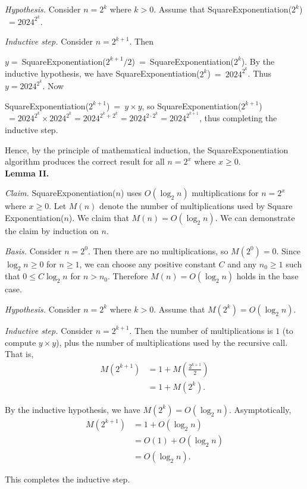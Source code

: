 \begin{enumerate}
\begin{solution}
\textit{Hypothesis. }Consider $n=2^k$ where $k>0$. Assume that {\sc SquareExponentiation}($2^k$)$~=2024^{2^k}$.

\textit{Inductive step. }Consider $n=2^{k+1}$. Then

$y=~${\sc SquareExponentiation}($2^{k+1}/2$)$~=~${\sc SquareExponentiation}($2^k$). By the inductive hypothesis, we have
{\sc SquareExponentiation}($2^k$)$~=~2024^{2^k}$. Thus $y=2024^{2^k}$. Now

{\sc SquareExponentiation}($2^{k+1}$)$~=~y\times y$, so {\sc SquareExponentiation}($2^{k+1}$)$~=2024^{2^k}\times 2024^{2^k}=2024^{2^k+2^k}=2024^{2\cdot 2^k}=2024^{2^{k+1}}$, thus completing the inductive step.

Hence, by the principle of mathematical induction, the {\sc SquareExponentiation} algorithm produces the correct result for all $n=2^x$ where $x\geq 0$.\\

\textbf{Lemma II. }

\textit{Claim. }{\sc SquareExponentiation}($n$) uses $O(\log_2n)$ multiplications for $n=2^x$ where $x\geq 0$. Let $M(n)$ denote the number of multiplications used by {\sc Square Exponentiation}($n$). We claim that $M(n)=O(\log_2n)$. We can demonstrate the claim by induction on $n$.

\textit{Basis. }Consider $n=2^0$. Then there are no multiplications, so $M(2^0)=0$. Since $\log_2n\geq 0$ for $n\geq 1$, we can choose any positive constant $C$ and any $n_0\geq 1$ such that $0\leq C\log_2n$ for $n>n_0$. Therefore $M(n)=O(\log_2n)$ holds in the base case.

\textit{Hypothesis. }Consider $n=2^k$ where $k>0$. Assume that $M(2^k)=O(\log_2n)$.

\textit{Inductive step. }Consider $n=2^{k+1}$. Then the number of multiplications is $1$ (to compute $y\times y$), plus the number of multiplications used by the recursive call. That is, 
\begin{align*}
M(2^{k+1})&=1+M\left(\frac{2^{k+1}}{2}\right)\\
&=1+M(2^k).
\end{align*}

By the inductive hypothesis, we have $M(2^k)=O(\log_2n)$. Asymptotically,
\begin{align*}
M(2^{k+1})&=1+O(\log_2n)\\
&=O(1)+O(\log_2n)\\
&=O(\log_2n).
\end{align*}

This completes the inductive step.


\end{solution}
\end{enumerate}
